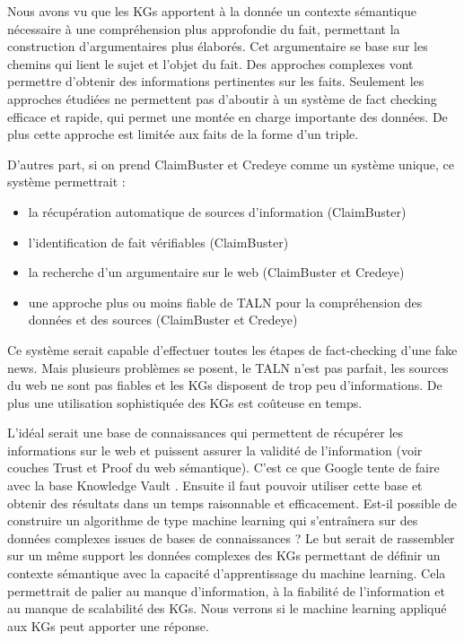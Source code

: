 Nous avons vu que les KGs apportent à la donnée un contexte sémantique nécessaire à une compréhension plus approfondie du fait, permettant la construction d'argumentaires plus élaborés. Cet argumentaire se base sur les chemins qui lient le sujet et l'objet du fait. Des approches complexes vont permettre d'obtenir des informations pertinentes sur les faits. Seulement les approches étudiées ne permettent pas d'aboutir à un système de fact checking efficace et rapide, qui permet une montée en charge importante des données. De plus cette approche est limitée aux faits de la forme d'un triple.

D'autres part, si on prend ClaimBuster et Credeye comme un système unique, ce système permettrait :
\begin{itemize}
    \item la récupération automatique de sources d'information (ClaimBuster)
    \item l'identification de fait vérifiables (ClaimBuster)
    \item la recherche d'un argumentaire sur le web (ClaimBuster et Credeye)
    \item une approche plus ou moins fiable de TALN pour la compréhension des données et des sources (ClaimBuster et Credeye)
\end{itemize}
Ce système serait capable d'effectuer toutes les étapes de fact-checking d'une fake news. Mais plusieurs problèmes se posent, le TALN n'est pas parfait, les sources du web ne sont pas fiables et les KGs disposent de trop peu d'informations. De plus une utilisation sophistiquée des KGs est coûteuse en temps.

L'idéal serait une base de connaissances qui permettent de récupérer les informations sur le web et puissent assurer la validité de l'information (voir couches Trust et Proof du web sémantique). C'est ce que Google tente de faire avec la base Knowledge Vault \cite{dong2014knowledge}. Ensuite il faut pouvoir utiliser cette base et obtenir des résultats dans un temps raisonnable et efficacement. Est-il possible de construire un algorithme de type machine learning qui s'entraînera sur des données complexes issues de bases de connaissances ? Le but serait de rassembler sur un même support les données complexes des KGs permettant de définir un contexte sémantique avec la capacité d'apprentissage du machine learning. Cela permettrait de palier au manque d'information, à la fiabilité de l'information et au manque de scalabilité des KGs. Nous verrons si le machine learning appliqué aux KGs peut apporter une réponse.

